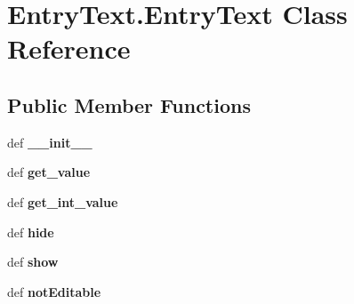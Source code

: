 \hypertarget{classEntryText_1_1EntryText}{\section{Entry\+Text.\+Entry\+Text Class Reference}
\label{classEntryText_1_1EntryText}
}
\subsection*{Public Member Functions}
\begin{DoxyCompactItemize}
\item 
\hypertarget{classEntryText_1_1EntryText_aa0f480a8a293253cba3ab545485a6a2e}{def {\bfseries \+\_\+\+\_\+init\+\_\+\+\_\+}}\label{classEntryText_1_1EntryText_aa0f480a8a293253cba3ab545485a6a2e}

\item 
\hypertarget{classEntryText_1_1EntryText_a3432cdd965ef000086cef763c25f31ca}{def {\bfseries get\+\_\+value}}\label{classEntryText_1_1EntryText_a3432cdd965ef000086cef763c25f31ca}

\item 
\hypertarget{classEntryText_1_1EntryText_a8ba228c1c2d6781dd3b54a09077593e9}{def {\bfseries get\+\_\+int\+\_\+value}}\label{classEntryText_1_1EntryText_a8ba228c1c2d6781dd3b54a09077593e9}

\item 
\hypertarget{classEntryText_1_1EntryText_ad3c9ab45f744dcc7f84800c668a9e923}{def {\bfseries hide}}\label{classEntryText_1_1EntryText_ad3c9ab45f744dcc7f84800c668a9e923}

\item 
\hypertarget{classEntryText_1_1EntryText_aa4c65a1d0aa22b2d651196b3d1a19be8}{def {\bfseries show}}\label{classEntryText_1_1EntryText_aa4c65a1d0aa22b2d651196b3d1a19be8}

\item 
\hypertarget{classEntryText_1_1EntryText_a8b6dacde8710e613f48006c287ea1bde}{def {\bfseries not\+Editable}}\label{classEntryText_1_1EntryText_a8b6dacde8710e613f48006c287ea1bde}

\end{DoxyCompactItemize}

